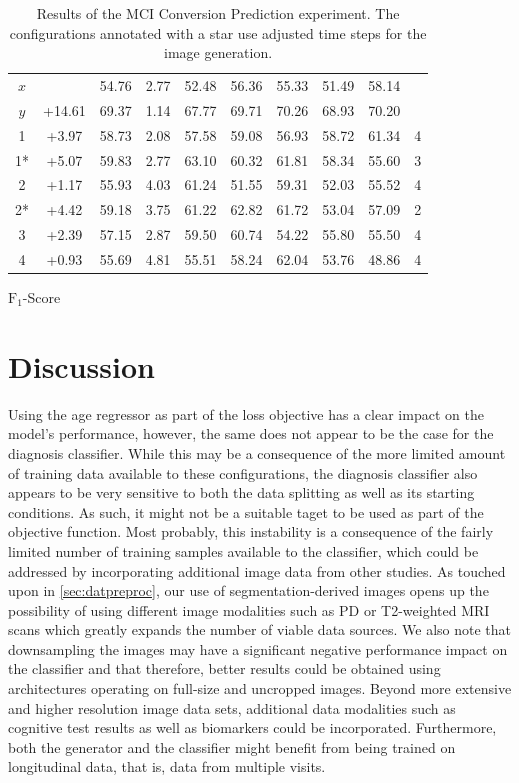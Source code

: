 \begin{table}[h]
\begin{center}
\begin{tabular}{c c c c c c c c c c}
			\cmidrule(lr){1-10}
			$x$\hphantom{*} &        & 54.76 & 2.77 & 52.48 & 56.36 & 55.33 & 51.49 & 58.14 &   \\
			$y$\hphantom{*} & +14.61 & 69.37 & 1.14 & 67.77 & 69.71 & 70.26 & 68.93 & 70.20 &   \\
			\cmidrule(lr){1-10}
			1\hphantom{*}   & +3.97  & 58.73 & 2.08 & 57.58 & 59.08 & 56.93 & 58.72 & 61.34 & 4 \\
			1*              & +5.07  & 59.83 & 2.77 & 63.10 & 60.32 & 61.81 & 58.34 & 55.60 & 3 \\
			2\hphantom{*}   & +1.17  & 55.93 & 4.03 & 61.24 & 51.55 & 59.31 & 52.03 & 55.52 & 4 \\
			2*              & +4.42  & 59.18 & 3.75 & 61.22 & 62.82 & 61.72 & 53.04 & 57.09 & 2 \\
			3\hphantom{*}   & +2.39  & 57.15 & 2.87 & 59.50 & 60.74 & 54.22 & 55.80 & 55.50 & 4 \\
			4\hphantom{*}   & +0.93  & 55.69 & 4.81 & 55.51 & 58.24 & 62.04 & 53.76 & 48.86 & 4 \\
			\bottomrule
		\end{tabular}
		\caption*{$\text{F}_1$-Score}
	\end{center}
	\caption{Results of the MCI Conversion Prediction experiment. The configurations annotated with a star use adjusted time steps for the image generation.}
	\label{tab:expconv}
\end{table}

\chapter{Discussion}

Using the age regressor as part of the loss objective has a clear impact on the model's performance, however, the same does not appear to be the case for the diagnosis classifier. While this may be a consequence of the more limited amount of training data available to these configurations, the diagnosis classifier also appears to be very sensitive to both the data splitting as well as its starting conditions. As such, it might not be a suitable taget to be used as part of the objective function. Most probably, this instability is a consequence of the fairly limited number of training samples available to the classifier, which could be addressed by incorporating additional image data from other studies. As touched upon in \autoref{sec:datpreproc}, our use of segmentation-derived images opens up the possibility of using different image modalities such as PD or T2-weighted MRI scans which greatly expands the number of viable data sources.
We also note that downsampling the images may have a significant negative performance impact on the classifier and that therefore, better results could be obtained using architectures operating on full-size and uncropped images.
Beyond more extensive and higher resolution image data sets, additional data modalities such as cognitive test results as well as biomarkers could be incorporated. Furthermore, both the generator and the classifier might benefit from being trained on longitudinal data, that is, data from multiple visits.

